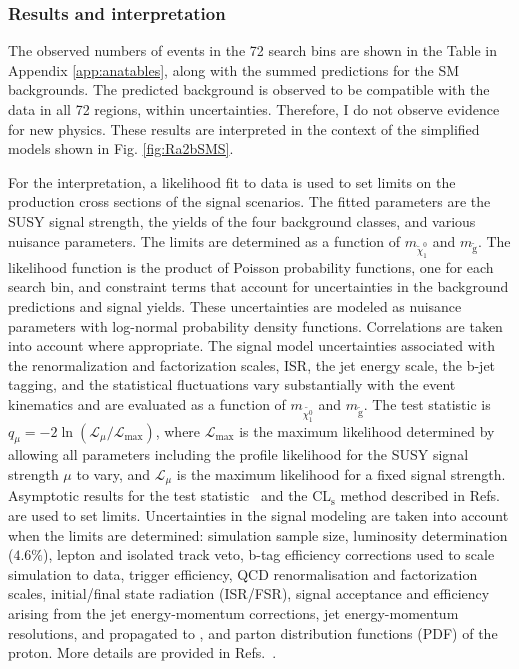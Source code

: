 \FloatBarrier
\subsubsection{Results and interpretation}
The observed numbers of events in the 72 search bins
are shown in the Table in Appendix \ref{app:anatables}, along with the summed predictions for the SM backgrounds. The predicted background is observed to be compatible
with the data in all 72 regions, within uncertainties. Therefore, I do not observe evidence for new physics.
These results are interpreted in the context of the simplified models shown in Fig. \ref{fig:Ra2bSMS}.



For the interpretation, a likelihood fit to data is used to set limits on
the production cross sections of the signal scenarios.
The fitted parameters are the SUSY signal strength,
the yields of the four background classes,
and various nuisance parameters.
The limits are determined as a function of $m_{\tilde{\chi}^{0}_{1}}$ and $m_{\tilde{\text{g}}}$.
The likelihood function is the product of Poisson probability functions,
one for each search bin,
and constraint terms that account for
uncertainties in the background predictions and signal yields.
These uncertainties are modeled as nuisance parameters
with log-normal probability density functions.
Correlations are taken into account where appropriate.
The signal model uncertainties associated with
the renormalization and factorization scales, ISR,
the jet energy scale,
the b-jet tagging,
and the statistical fluctuations
vary substantially with the event kinematics
and are evaluated as a function of $m_{\tilde{\chi^{0}_{1}}}$ and $m_{\tilde{\text{g}}}$.
The test statistic is
$q_\mu =  - 2 \ln \left( \mathcal{L}_\mu/\mathcal{L}_\text{max} \right)$,
where $\mathcal{L}_\text{max}$ is the maximum likelihood
determined by allowing all parameters including the profile likelihood for the
SUSY signal strength $\mu$ to vary,
and $\mathcal{L}_\mu$ is the maximum likelihood for a fixed signal strength.
Asymptotic results for the test statistic~\cite{Cowan:2010js}
and the CL$_\mathrm{s}$
method described in Refs.~\cite{Junk1999,bib-cls} are used to set limits. 
Uncertainties in the signal modeling are taken into account when the limits are determined: simulation sample size, luminosity determination ($4.6\%$), lepton and isolated track veto, b-tag efficiency corrections used to scale simulation to data, trigger efficiency, QCD renormalisation and factorization scales, initial/final state radiation (ISR/FSR), signal acceptance and efficiency arising from the jet energy-momentum corrections, jet energy-momentum resolutions, and propagated to \MET, and parton distribution functions (PDF) of the proton. More details are provided in Refs.~\cite{cms-note-2011-005,Khachatryan:2015vra}.


